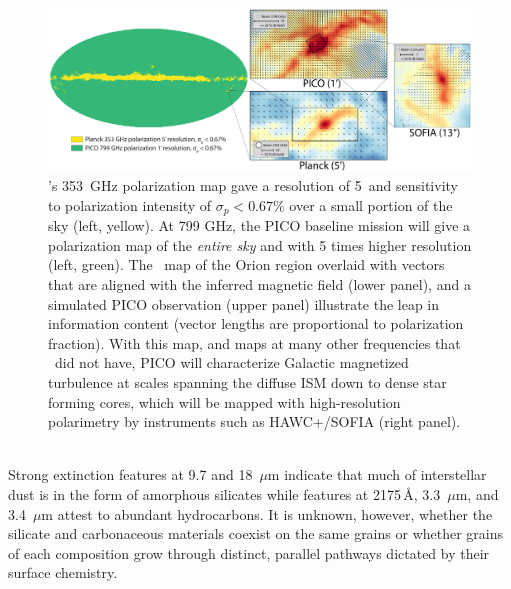 \documentclass[PICOReport.tex]{subfiles}
\begin{document}
%
%
\begin{figure}
    \centering
    \includegraphics[width=6.5in]{images/galsci_fig_v4.pdf}
    \caption{\captiontext  \planck 's 353~GHz polarization map gave a resolution of 5\arcmin~and sensitivity to polarization intensity of $\sigma_{p} < 0.67\%$ over a small portion of the sky (left, yellow).  At 799 GHz, the PICO baseline mission will give a polarization map of the {\it entire sky} and with 5 times higher resolution (left, green). The \planck~map of the Orion region overlaid with vectors that are aligned with the inferred magnetic field (lower panel), and a simulated PICO observation (upper panel) illustrate the leap in information content (vector lengths are proportional to polarization fraction). With this map, and maps at many other frequencies that \planck~did not have, PICO will characterize Galactic magnetized turbulence at scales spanning the diffuse ISM down to dense star forming cores, which will be mapped with high-resolution polarimetry by instruments such as HAWC+/SOFIA \citep{Chuss2018} (right panel).}
    \label{fig:allsky}
\end{figure}

 \\
Strong extinction features at 9.7 and 18~$\mu$m indicate that much of interstellar dust is in the form of amorphous silicates while features at 2175\,\AA, 3.3~$\mu$m, and 3.4~$\mu$m attest to abundant hydrocarbons. It is unknown, however, whether the silicate and carbonaceous materials coexist on the same grains or whether grains of each composition grow through distinct, parallel pathways dictated by their surface chemistry. 
\end{document}

